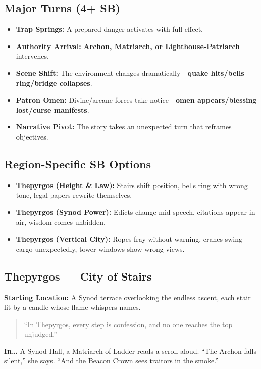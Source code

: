 \subsection*{Major Turns (4+ SB)}
\begin{itemize}
\item \textbf{Trap Springs:} A prepared danger activates with full effect.
\item \textbf{Authority Arrival:} \textbf{Archon, Matriarch, or Lighthouse-Patriarch} intervenes.
\item \textbf{Scene Shift:} The environment changes dramatically - \textbf{quake hits/bells ring/bridge collapses}.
\item \textbf{Patron Omen:} Divine/arcane forces take notice - \textbf{omen appears/blessing lost/curse manifests}.
\item \textbf{Narrative Pivot:} The story takes an unexpected turn that reframes objectives.
\end{itemize}

\subsection*{Region-Specific SB Options}
\begin{itemize}
\item \textbf{Thepyrgos (Height \& Law):} Stairs shift position, bells ring with wrong tone, legal papers rewrite themselves.
\item \textbf{Thepyrgos (Synod Power):} Edicts change mid-speech, citations appear in air, wisdom comes unbidden.
\item \textbf{Thepyrgos (Vertical City):} Ropes fray without warning, cranes swing cargo unexpectedly, tower windows show wrong views.
\end{itemize}


\subsection*{Thepyrgos — City of Stairs}
\textbf{Starting Location:} A Synod terrace overlooking the endless ascent, each stair lit by a candle whose flame whispers names.
\begin{quote}
“In Thepyrgos, every step is confession, and no one reaches the top unjudged.”
\end{quote}

\textbf{In…} A Synod Hall, a Matriarch of Ladder reads a scroll aloud. ``The Archon falls silent,'' she says. ``And the Beacon Crown sees traitors in the smoke.''
